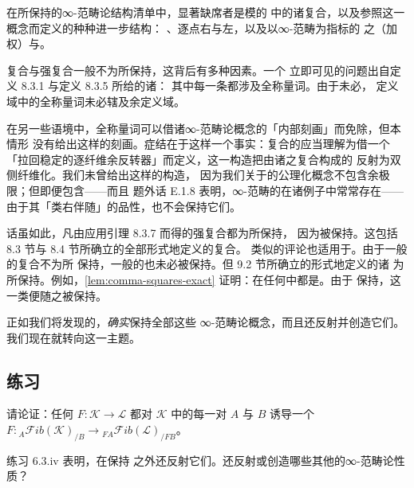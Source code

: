 \begin{warning}\label{war:composites-not-preserved}
在\trCosmologicalFunctor{}所保持的∞-范畴论结构清单中，显著缺席者是模的%
\trVirtualEquipment{}中的诸复合，以及参照这一概念而定义的种种进一步结构：
\trExactSquare、逐点右\trExtension{}与左\trExtension，以及以∞-范畴为指标的%
\trDiagram{}之（加权）\trLimit{}与\trColimit。

复合与强复合一般不为\trCosmologicalFunctor{}所保持，这背后有多种因素。一个
立即可见的问题出自定义 8.3.1 与定义 8.3.5 所给的诸\trUniversalProperty：
其中每一条都涉及全称量词。由于\trCosmologicalFunctor{}未必\trEssentiallySurjective，
定义域中的全称量词未必辖及余定义域。

在另一些语境中，全称量词可以借诸∞-范畴论概念的「内部刻画」而免除，但本情形
没有给出这样的刻画。症结在于这样一个事实：复合的\trModule{}应当理解为借一个
「拉回稳定的逐纤维余反转器」而定义，这一构造把由诸\trSpan{}之复合构成的%
\trTwoSidedFibration{}反射为\trDiscrete{}双侧纤维化。我们未曾给出这样的构造，
因为我们关于\trInfinityCosmos{}的公理化概念不包含余极限；但即便包含——而且
题外话 E.1.8 表明，∞-范畴的\trHomotopyColimit{}在诸例子中常常存在——%
\trCosmologicalFunctor{}由于其「类右伴随」的品性，也不会保持它们。

话虽如此，凡由应用引理 8.3.7 而得的强复合都为\trCosmologicalFunctor{}所保持，
因为\trFiberedAdjunction{}被保持。这包括 8.3 节与 8.4 节所确立的全部形式地定义的复合。
类似的评论也适用于\trExactSquare。由于一般的复合不为\trCosmologicalFunctor{}所
保持，一般的\trExactSquare{}也未必被保持。但 9.2 节所确立的形式地定义的诸%
\trExactSquare{}为\trCosmologicalFunctor{}所保持。例如，\cref{lem:comma-squares-exact}
证明：\trCommaSquare{}在任何\trInfinityCosmos{}中都是\trExactSquare。由于%
\trCosmologicalFunctor{}保持\trCommaSquare，这一类\trExactSquare{}便随之被保持。

正如我们将发现的，\trCosmologicalBiequivalence{}\emph{确实}保持全部这些
∞-范畴论概念，而且还反射并创造它们。我们现在就转向这一主题。
\end{warning}

\subsection*{练习}

\begin{exercise}\label{ex:sliced-fib-cosmos-functor}
请论证：任何\trCosmologicalFunctor{} $F\colon\mathcal{K}\to\mathcal{L}$ 都对
$\mathcal{K}$ 中的每一对\trInfinityCategory{} $A$ 与 $B$ 诱导一个%
\trCosmologicalFunctor{}
$F\colon{}_{A}\mathcal{F}\mathit{ib}(\mathcal{K})_{/B}\to{}_{FA}\mathcal{F}\mathit{ib}(\mathcal{L})_{/FB}$。
\end{exercise}

\begin{exercise}\label{ex:reflected-created-properties}
练习 6.3.iv 表明，\trCosmologicalEmbedding{}在保持\trDiscrete{}\trInfinityCategory{}%
之外还反射它们。\trCosmologicalEmbedding{}还反射或创造哪些其他的∞-范畴论性质？
\end{exercise}

